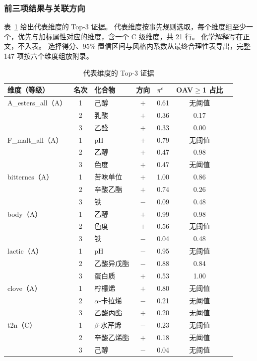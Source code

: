 \subsubsection{前三项结果与关联方向}

表~\ref{tab:q2-rep} 给出代表维度的 Top-3 证据。
代表维度按事先规则选取，每个维度组至少一个，优先与加标属性对应的维度，含一个 C 级维度，共 21 行。
化学解释写在正文，不入表。
选择得分、95\% 置信区间与风格内系数从最终合理性表导出，完整 147 项按六个维度组放附录。

\begin{table}[htbp]
\centering\small
\caption{代表维度的 Top-3 证据}
\label{tab:q2-rep}
\begin{tabular}{lclclcl}
\toprule
维度（等级） & 名次 & 化合物 & 方向 & $\pi^c$ & OAV$\ge$1 占比 \\
\midrule
A\_esters\_all（A） & 1 & 己醇 & $+$ & 0.61 & 无阈值 \\
 & 2 & 乳酸 & $+$ & 0.36 & 0.17 \\
 & 3 & 乙醛 & $+$ & 0.33 & 0.00 \\
\addlinespace
F\_malt\_all（A） & 1 & pH & $+$ & 0.79 & 无阈值 \\
 & 2 & 乙醇 & $+$ & 0.47 & 0.98 \\
 & 3 & 色度 & $+$ & 0.47 & 无阈值 \\
\addlinespace
bitternes（A） & 1 & 苦味单位 & $+$ & 1.00 & 0.86 \\
 & 2 & 辛酸乙酯 & $+$ & 0.74 & 0.26 \\
 & 3 & 铁 & $-$ & 0.09 & 0.48 \\
\addlinespace
body（A） & 1 & 乙醇 & $+$ & 0.99 & 0.98 \\
 & 2 & 色度 & $+$ & 0.56 & 无阈值 \\
 & 3 & 铁 & $-$ & 0.04 & 0.48 \\
\addlinespace
lactic（A） & 1 & pH & $-$ & 0.95 & 无阈值 \\
 & 2 & 乙酸异戊酯 & $-$ & 0.88 & 0.84 \\
 & 3 & 蛋白质 & $+$ & 0.53 & 1.00 \\
\addlinespace
clove（A） & 1 & 柠檬烯 & $+$ & 0.80 & 无阈值 \\
 & 2 & $\alpha$-卡拉烯 & $-$ & 0.21 & 无阈值 \\
 & 3 & 乙酸丙酯 & $+$ & 0.20 & 无阈值 \\
\addlinespace
t2n（C） & 1 & $\beta$-水芹烯 & $-$ & 0.23 & 无阈值 \\
 & 2 & 辛酸乙烯酯 & $+$ & 0.18 & 无阈值 \\
 & 3 & 己醇 & $-$ & 0.04 & 无阈值 \\
\bottomrule
\end{tabular}
\end{table}

